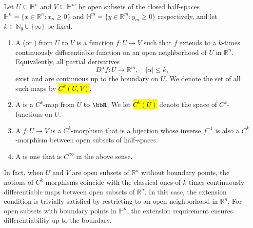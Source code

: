 \begin{definition} \label{definition:C_k_map_between_open_subsets_of_closed_half_spaces_of_Rns}
    Let $U \subseteq \mathbb{H}^n$ and $V \subseteq \mathbb{H}^m$ be open subsets of the closed half-spaces 
    $\mathbb{H}^n = \{ x \in \mathbb{R}^n : x_n \geq 0 \}$ and $\mathbb{H}^m = \{ y \in \mathbb{R}^m : y_m \geq 0 \}$ respectively, 
    and let $k \in \mathbb{N}_0 \cup \{\infty\}$ be fixed.
    \begin{enumerate}
        \item A  (or ) from $U$ to $V$ is a function $f : U \to V$
        such that $f$ extends to a $k$-times continuously differentiable function on an open neighborhood of $U$ in $\mathbb{R}^n$.
        Equivalently, all partial derivatives
        $$ D^\alpha f : U \to \mathbb{R}^m, \quad |\alpha| \leq k, $$ 
        exist and are continuous up to the boundary on $U$.
        We denote the set of all such maps by \hl{$C^k(U, V)$}.

        \item A  is a $C^k$-map from $U$ to $\bbR$. We let \hl{$C^k(U)$} denote the space of $C^k$-functions on $U$.

        \item A  $f: U \to V$ is a $C^k$-morphism that is a bijection whose inverse $f^{-1}$ is also a $C^k$-morphism between open subsets of half-spaces.

        \item A  is one that is $C^\infty$ in the above sense.
    \end{enumerate}
    In fact, when $U$ and $V$ are open subsets of $\mathbb{R}^n$ without boundary points, the notions of $C^k$-morphisms coincide with the classical ones of $k$-times continuously differentiable maps between open subsets of $\mathbb{R}^n$. In this case, the extension condition is trivially satisfied by restricting to an open neighborhood in $\mathbb{R}^n$. For open subsets with boundary points in $\mathbb{H}^n$, the extension requirement ensures differentiability up to the boundary.
\end{definition}


